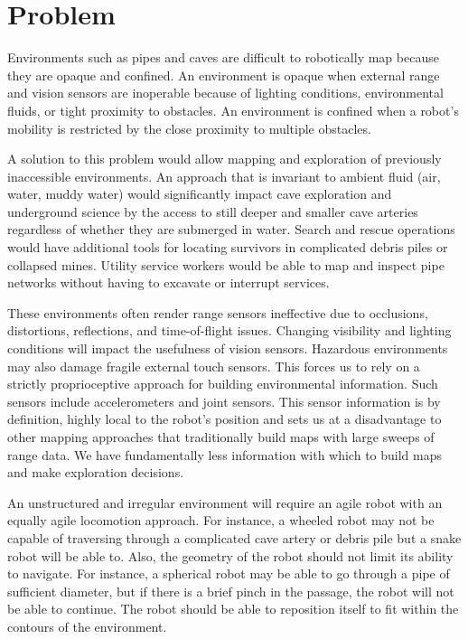 \section{Problem}

Environments such as pipes and caves are difficult to robotically map because they are opaque and confined.  An environment is opaque when external range and vision sensors are inoperable because of lighting conditions, environmental fluids, or tight proximity to obstacles.  An environment is confined when a robot’s mobility is restricted by the close proximity to multiple obstacles.

A solution to this problem would allow mapping and exploration of previously inaccessible environments.  An approach that is invariant to ambient fluid (air, water, muddy water) would significantly impact cave exploration and underground science by the access to still deeper and smaller cave arteries regardless of whether they are submerged in water.  Search and rescue operations would have additional tools for locating survivors in complicated debris piles or collapsed mines.  Utility service workers would be able to map and inspect pipe networks without having to excavate or interrupt services.

These environments often render range sensors ineffective due to occlusions, distortions, reflections, and time-of-flight issues.  Changing visibility and lighting conditions will impact the usefulness of vision sensors.  Hazardous environments may also damage fragile external touch sensors.  This forces us to rely on a strictly proprioceptive approach for building environmental information.  Such sensors include accelerometers and joint sensors.  This sensor information is by definition, highly local to the robot’s position and sets us at a disadvantage to other mapping approaches that traditionally build maps with large sweeps of range data.  We have fundamentally less information with which to build maps and make exploration decisions.

An unstructured and irregular environment will require an agile robot with an equally agile locomotion approach.  For instance, a wheeled robot may not be capable of traversing through a complicated cave artery or debris pile but a snake robot will be able to.  Also, the geometry of the robot should not limit its ability to navigate.  For instance, a spherical robot may be able to go through a pipe of sufficient diameter, but if there is a brief pinch in the passage, the robot will not be able to continue.  The robot should be able to reposition itself to fit within the contours of the environment.

